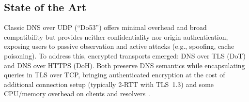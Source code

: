 %


\subsection{State of the Art}
Classic DNS over UDP (``Do53'') offers minimal overhead and broad compatibility but provides neither confidentiality nor origin authentication, exposing users to passive observation and active attacks (e.g., spoofing, cache poisoning). To address this, encrypted transports emerged: DNS over TLS (DoT) and DNS over HTTPS (DoH). Both preserve DNS semantics while encapsulating queries in TLS over TCP, bringing authenticated encryption at the cost of additional connection setup (typically 2-RTT with TLS~1.3) and some CPU/memory overhead on clients and resolvers~\cite{lyu2023survey}.

